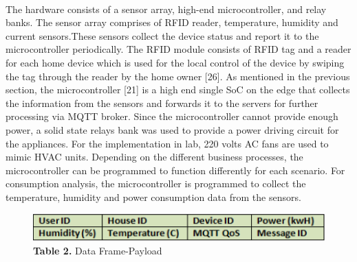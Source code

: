 \documentclass[a4paper,12pt,oneside]{article}
\let\counterwithin\relax
\begin{document}
\paragraph{}
The hardware consists of a sensor array, high-end
microcontroller, and relay banks. The sensor array comprises
of RFID reader, temperature, humidity and current sensors.These sensors collect the device status and report it to the
microcontroller periodically. The RFID module consists of
RFID tag and a reader for each home device which is used for
the local control of the device by swiping the tag through the
reader by the home owner [26]. As mentioned in the previous
section, the microcontroller [21] is a high end single SoC on
the edge that collects the information from the sensors and
forwards it to the servers for further processing via MQTT
broker. Since the microcontroller cannot provide enough
power, a solid state relays bank was used to provide a power
driving circuit for the appliances. For the implementation in
lab, 220 volts AC fans are used to mimic HVAC units.
Depending on the different business processes, the
microcontroller can be programmed to function differently for
each scenario. For consumption analysis, the microcontroller
is programmed to collect the temperature, humidity and power
consumption data from the sensors.


\begin{figure}[H]
\includegraphics[width=15cm]{Table2.png}
\centering
\caption{\textbf{Table 2.} Data Frame-Payload}
\end{figure}
\end{document}
